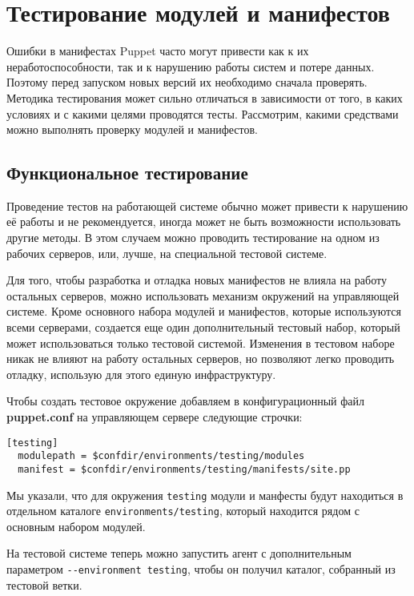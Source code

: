 \chapter{Тестирование модулей и манифестов}

Ошибки в манифестах Puppet часто могут привести как к их неработоспособности, так и к нарушению работы систем и потере данных. Поэтому перед запуском новых версий их необходимо сначала проверять. Методика тестирования может сильно отличаться в зависимости от того, в каких условиях и с какими целями проводятся тесты. Рассмотрим, какими средствами можно выполнять проверку модулей и манифестов.

\section{Функциональное тестирование}

Проведение тестов на работающей системе обычно может привести к нарушению её работы и не рекомендуется, иногда может не быть возможности использовать другие методы. В этом случаем можно проводить тестирование на одном из рабочих серверов, или, лучше, на специальной тестовой системе.

Для того, чтобы разработка и отладка новых манифестов не влияла на работу остальных серверов, можно использовать механизм окружений на управляющей системе. Кроме основного набора модулей и манифестов, которые используются всеми серверами, создается еще один дополнительный тестовый набор, который может использоваться только тестовой системой. Изменения в тестовом наборе никак не влияют на работу остальных серверов, но позволяют легко проводить отладку, использую для этого единую инфраструктуру.

Чтобы создать тестовое окружение добавляем в конфигурационный файл \textbf{puppet.conf} на управляющем сервере следующие строчки:

\begin{verbatim}
[testing]
  modulepath = $confdir/environments/testing/modules
  manifest = $confdir/environments/testing/manifests/site.pp
\end{verbatim}

Мы указали, что для окружения \texttt{testing} модули и манфесты будут находиться в отдельном каталоге \texttt{environments/testing}, который находится рядом с основным набором модулей.

На тестовой системе теперь можно запустить агент с дополнительным параметром \texttt{-{}-environment testing}, чтобы он получил каталог, собранный из тестовой ветки.

